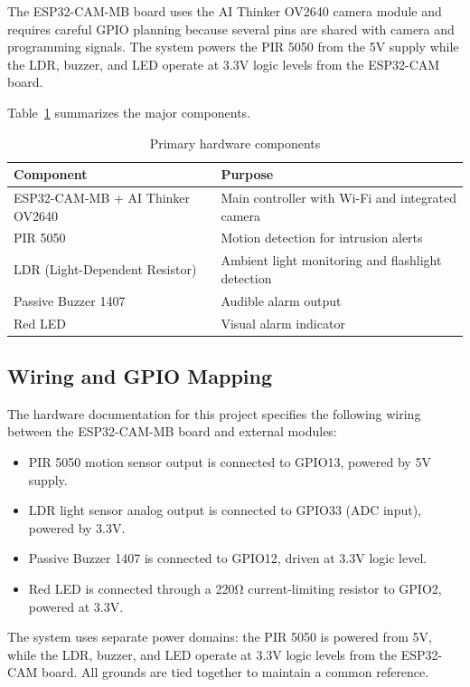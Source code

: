 \documentclass[conference]{IEEEtran}
\begin{document}
The ESP32-CAM-MB board uses the AI Thinker OV2640 camera module and requires careful GPIO planning because several pins are shared with camera and programming signals. The system powers the PIR 5050 from the 5V supply while the LDR, buzzer, and LED operate at 3.3V logic levels from the ESP32-CAM board.

Table~\ref{tab:components} summarizes the major components.

\begin{table}[ht]
\centering
\caption{Primary hardware components}
\label{tab:components}
\begin{tabularx}{\columnwidth}{|p{2.8cm}|X|}
\toprule
Component & Purpose \\
\midrule
ESP32-CAM-MB + AI Thinker OV2640 & Main controller with Wi-Fi and integrated camera \\
PIR 5050 & Motion detection for intrusion alerts \\
LDR (Light-Dependent Resistor) & Ambient light monitoring and flashlight detection \\
Passive Buzzer 1407 & Audible alarm output \\
Red LED & Visual alarm indicator \\
\bottomrule
\end{tabularx}
\end{table}

\subsection{Wiring and GPIO Mapping}
The hardware documentation for this project specifies the following wiring between the ESP32-CAM-MB board and external modules:
\begin{itemize}
  \item PIR 5050 motion sensor output is connected to GPIO13, powered by 5V supply.
  \item LDR light sensor analog output is connected to GPIO33 (ADC input), powered by 3.3V.
  \item Passive Buzzer 1407 is connected to GPIO12, driven at 3.3V logic level.
  \item Red LED is connected through a 220Ω current-limiting resistor to GPIO2, powered at 3.3V.
\end{itemize}

The system uses separate power domains: the PIR 5050 is powered from 5V, while the LDR, buzzer, and LED operate at 3.3V logic levels from the ESP32-CAM board. All grounds are tied together to maintain a common reference.
\end{document}
